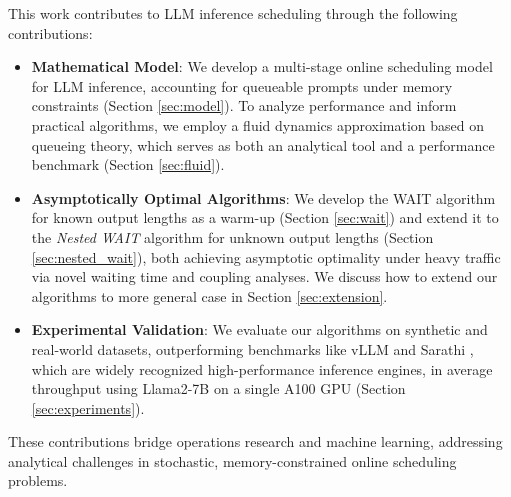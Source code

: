 This work contributes to LLM inference scheduling through the following contributions:
\begin{itemize}
\item \textbf{Mathematical Model}: We develop a multi-stage online scheduling model for LLM inference, accounting for queueable prompts under memory constraints (Section \ref{sec:model}). To analyze performance and inform practical algorithms, we employ a fluid dynamics approximation based on queueing theory, which serves as both an analytical tool and a performance benchmark (Section \ref{sec:fluid}).
    \item \textbf{Asymptotically Optimal Algorithms}: We develop the WAIT algorithm for known output lengths as a warm-up (Section \ref{sec:wait}) and extend it to the \textit{Nested WAIT} algorithm for unknown output lengths (Section \ref{sec:nested_wait}), both achieving asymptotic optimality under heavy traffic via novel waiting time and coupling analyses. We discuss how to extend our algorithms to more general case in Section \ref{sec:extension}.
    \item \textbf{Experimental Validation}: We evaluate our algorithms on synthetic and real-world datasets, outperforming benchmarks like vLLM \citep{kwon2023efficient} and Sarathi \citep{agrawal2023sarathi}, which are widely recognized high-performance inference engines, in average throughput using Llama2-7B on a single A100 GPU (Section \ref{sec:experiments}).
\end{itemize}
These contributions bridge operations research and machine learning, addressing analytical challenges in stochastic, memory-constrained online scheduling problems.

